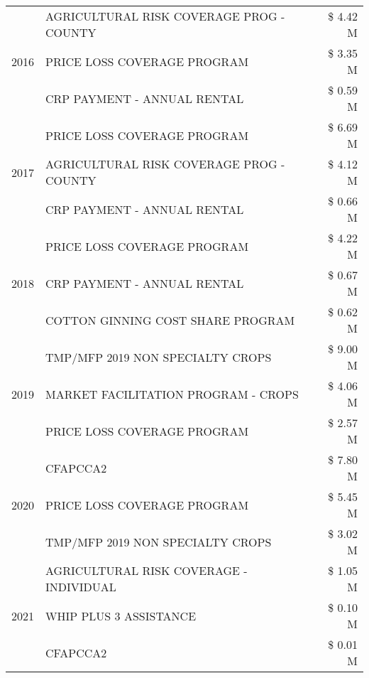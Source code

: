 \begin{tabular}{llr}
\multirow[t]{3}{*}{2016} & AGRICULTURAL RISK COVERAGE PROG - COUNTY & \$ 4.42 M \\
 & PRICE LOSS COVERAGE PROGRAM & \$ 3.35 M \\
 & CRP PAYMENT - ANNUAL RENTAL & \$ 0.59 M \\
\cline{1-3}
\multirow[t]{3}{*}{2017} & PRICE LOSS COVERAGE PROGRAM & \$ 6.69 M \\
 & AGRICULTURAL RISK COVERAGE PROG - COUNTY & \$ 4.12 M \\
 & CRP PAYMENT - ANNUAL RENTAL & \$ 0.66 M \\
\cline{1-3}
\multirow[t]{3}{*}{2018} & PRICE LOSS COVERAGE PROGRAM & \$ 4.22 M \\
 & CRP PAYMENT - ANNUAL RENTAL & \$ 0.67 M \\
 & COTTON GINNING COST SHARE PROGRAM & \$ 0.62 M \\
\cline{1-3}
\multirow[t]{3}{*}{2019} & TMP/MFP 2019 NON SPECIALTY CROPS & \$ 9.00 M \\
 & MARKET FACILITATION PROGRAM - CROPS & \$ 4.06 M \\
 & PRICE LOSS COVERAGE PROGRAM & \$ 2.57 M \\
\cline{1-3}
\multirow[t]{3}{*}{2020} & CFAPCCA2 & \$ 7.80 M \\
 & PRICE LOSS COVERAGE PROGRAM & \$ 5.45 M \\
 & TMP/MFP 2019 NON SPECIALTY CROPS & \$ 3.02 M \\
\cline{1-3}
\multirow[t]{3}{*}{2021} & AGRICULTURAL RISK COVERAGE - INDIVIDUAL & \$ 1.05 M \\
 & WHIP PLUS 3 ASSISTANCE & \$ 0.10 M \\
 & CFAPCCA2 & \$ 0.01 M \\
\cline{1-3}
\bottomrule
\end{tabular}
